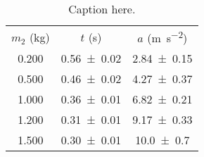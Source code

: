 \begin{table}
\caption{\label{tab:newtable1} Caption here.}
\begin{center}
\begin{ruledtabular}
\begin{tabular}{ccc}
$m_2$ (\unit{\kilo\gram}) & $t$ (\unit{\second}) & $a$ (\unit{\meter\per\second\squared}) \\ 
\colrule
\num{0.200} & \num{0.56\pm0.02} & \num{2.84\pm0.15} \\ 
\num{0.500} & \num{0.46\pm0.02} & \num{4.27\pm0.37} \\ 
\num{1.000} & \num{0.36\pm0.01} & \num{6.82\pm0.21} \\ 
\num{1.200} & \num{0.31\pm0.01} & \num{9.17\pm0.33} \\ 
\num{1.500} & \num{0.30\pm0.01} & \num{10.0\pm0.7} \\ 
\end{tabular}
\end{ruledtabular}
\end{center}
\end{table}

